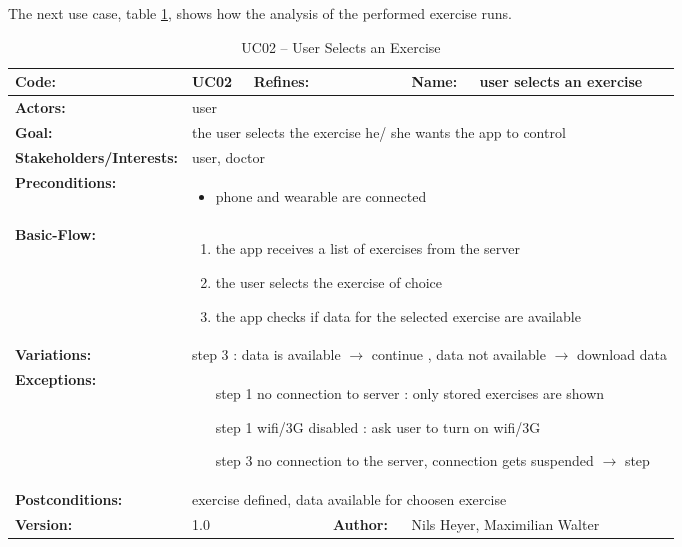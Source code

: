 The next use case, table \ref{tab:1}, shows how the analysis of the performed exercise runs.
\begin{table}[H]
	\begin{tabular}{|l|l|l|l|l|l|} \hline
		\textbf{Code:} & UC02 & \textbf{Refines:} &  & \textbf{Name:} & user selects an exercise \\ \hline
		\textbf{Actors:} & \multicolumn{5}{l|}{user} \\ \hline
		\textbf{Goal:} & \multicolumn{5}{l|}{the user selects the exercise he/ she wants the app to control} \\ \hline
		\textbf{Stakeholders/Interests:} & \multicolumn{5}{l|}{user, doctor} \\ \hline
		\textbf{Preconditions:} & \multicolumn{5}{l|}{\parbox{0.75\textwidth}{
			\begin{itemize}
				\item phone and wearable are connected
			\end{itemize}
		}} \\ \hline
		\textbf{Basic-Flow:} & \multicolumn{5}{l|}{\parbox{0.75\textwidth}{
			\begin{enumerate}
				\item the app receives a list of exercises from the server
				\item the user selects the exercise of choice
				\item the app checks if data for the selected exercise are available
			\end{enumerate}
		}} \\ \hline
		\textbf{Variations:} & \multicolumn{5}{l|}{
			step 3 : data is available $\rightarrow$ continue , data not available  $\rightarrow$ download data
		} \\ \hline
		\textbf{Exceptions:} & \multicolumn{5}{l|}{\parbox{0.75\textwidth}{
			\begin{itemize}[leftmargin=1.55cm]
				\item[step 1] no connection to server :  only stored exercises are shown
				\item[step 1] wifi/3G disabled  : ask user to turn on wifi/3G
				\item[step 3] no connection to the server, connection gets suspended $\rightarrow$ step
			\end{itemize}
		}} \\ \hline
		\textbf{Postconditions:} & \multicolumn{5}{l|}{exercise defined, data available for choosen exercise} \\ \hline
		\textbf{Version:} & \multicolumn{2}{l|}{1.0} & \textbf{Author:} & \multicolumn{2}{l|}{Nils Heyer, Maximilian Walter} \\ \hline
	\end{tabular}
	\caption{UC02 -- User Selects an Exercise}
	\label{tab:1}
\end{table}

